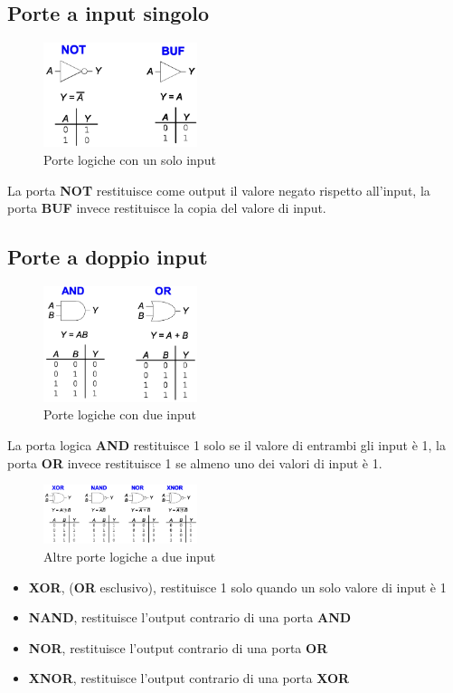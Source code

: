 \documentclass[../main.tex]{subfiles}
\begin{document}
\subsection{Porte a input singolo}
\begin{figure}[h]
    \centering
    \includegraphics[width=0.4\textwidth]{images/singleInput.png}
    \caption{Porte logiche con un solo input}
\end{figure}
La porta \textbf{NOT} restituisce come output il valore negato rispetto all'input, la porta \textbf{BUF} invece
restituisce la copia del valore di input.

\subsection{Porte a doppio input}
\begin{figure}[h]
    \centering
    \includegraphics[width=0.4\textwidth]{images/doubleInput.png}
    \caption{Porte logiche con due input}
\end{figure}
La porta logica \textbf{AND} restituisce 1 solo se il valore di entrambi gli input è 1, la porta \textbf{OR} invece
restituisce 1 se almeno uno dei valori di input è 1.

\begin{figure}[h]
    \centering
    \includegraphics[width=0.4\textwidth]{images/logicGates.png}
    \caption{Altre porte logiche a due input}
\end{figure}
\begin{itemize}
    \item \textbf{XOR}, (\textbf{OR} esclusivo), restituisce 1 solo quando un solo valore di input è 1
    \item \textbf{NAND}, restituisce l'output contrario di una porta \textbf{AND}
    \item \textbf{NOR}, restituisce l'output contrario di una porta \textbf{OR}
    \item \textbf{XNOR}, restituisce l'output contrario di una porta \textbf{XOR}
\end{itemize}
\end{document}
